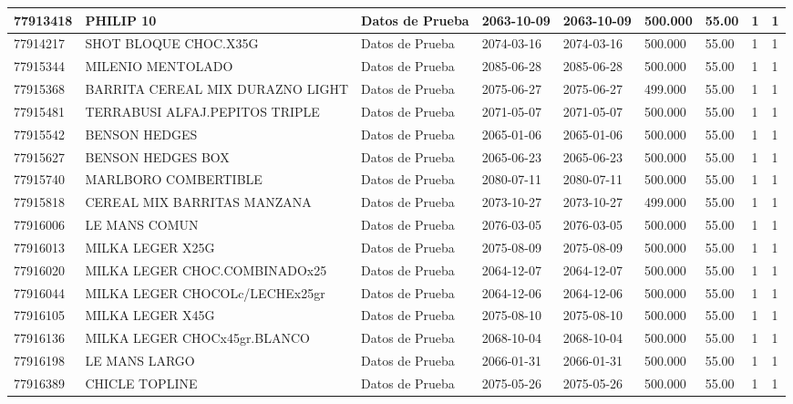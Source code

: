 \documentclass[a4paper,12pt]{article}
\begin{document}
\begin{landscape}
\begin{longtable}{|p{4cm}|p{2.5cm}|p{2.5cm}|p{1.8cm}|p{1.8cm}|p{1cm}|p{1cm}|p{3cm}|p{3cm}||}
77913418 & PHILIP 10 & Datos de Prueba & 2063-10-09 & 2063-10-09 & 500.000 & 55.00 & 1 & 1 \\ \hline 
77914217 & SHOT BLOQUE CHOC.X35G & Datos de Prueba & 2074-03-16 & 2074-03-16 & 500.000 & 55.00 & 1 & 1 \\ \hline 
77915344 & MILENIO   MENTOLADO & Datos de Prueba & 2085-06-28 & 2085-06-28 & 500.000 & 55.00 & 1 & 1 \\ \hline 
77915368 & BARRITA CEREAL MIX DURAZNO LIGHT & Datos de Prueba & 2075-06-27 & 2075-06-27 & 499.000 & 55.00 & 1 & 1 \\ \hline 
77915481 & TERRABUSI ALFAJ.PEPITOS TRIPLE & Datos de Prueba & 2071-05-07 & 2071-05-07 & 500.000 & 55.00 & 1 & 1 \\ \hline 
77915542 & BENSON HEDGES & Datos de Prueba & 2065-01-06 & 2065-01-06 & 500.000 & 55.00 & 1 & 1 \\ \hline 
77915627 & BENSON HEDGES BOX & Datos de Prueba & 2065-06-23 & 2065-06-23 & 500.000 & 55.00 & 1 & 1 \\ \hline 
77915740 & MARLBORO COMBERTIBLE & Datos de Prueba & 2080-07-11 & 2080-07-11 & 500.000 & 55.00 & 1 & 1 \\ \hline 
77915818 & CEREAL MIX BARRITAS MANZANA & Datos de Prueba & 2073-10-27 & 2073-10-27 & 499.000 & 55.00 & 1 & 1 \\ \hline 
77916006 & LE MANS COMUN & Datos de Prueba & 2076-03-05 & 2076-03-05 & 500.000 & 55.00 & 1 & 1 \\ \hline 
77916013 & MILKA LEGER X25G & Datos de Prueba & 2075-08-09 & 2075-08-09 & 500.000 & 55.00 & 1 & 1 \\ \hline 
77916020 & MILKA LEGER CHOC.COMBINADOx25 & Datos de Prueba & 2064-12-07 & 2064-12-07 & 500.000 & 55.00 & 1 & 1 \\ \hline 
77916044 & MILKA LEGER CHOCOLc/LECHEx25gr & Datos de Prueba & 2064-12-06 & 2064-12-06 & 500.000 & 55.00 & 1 & 1 \\ \hline 
77916105 & MILKA LEGER X45G & Datos de Prueba & 2075-08-10 & 2075-08-10 & 500.000 & 55.00 & 1 & 1 \\ \hline 
77916136 & MILKA LEGER CHOCx45gr.BLANCO & Datos de Prueba & 2068-10-04 & 2068-10-04 & 500.000 & 55.00 & 1 & 1 \\ \hline 
77916198 & LE MANS LARGO & Datos de Prueba & 2066-01-31 & 2066-01-31 & 500.000 & 55.00 & 1 & 1 \\ \hline 
77916389 & CHICLE TOPLINE & Datos de Prueba & 2075-05-26 & 2075-05-26 & 500.000 & 55.00 & 1 & 1 \\ \hline 

\end{longtable}
\end{landscape}
\end{document}
